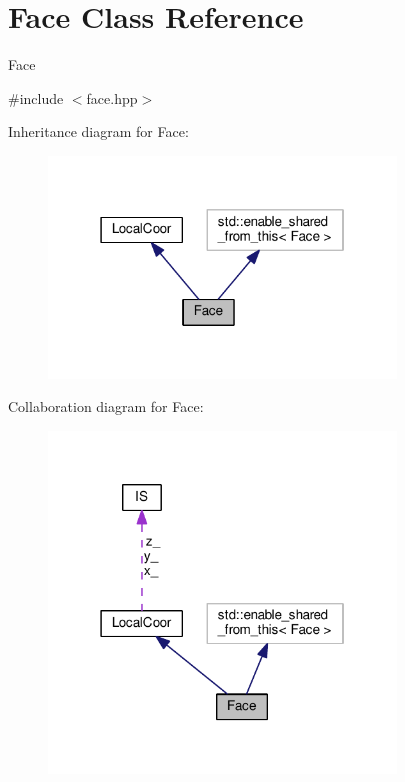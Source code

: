 \hypertarget{classFace}{\section{Face Class Reference}
\label{classFace}
}


Face  




{\ttfamily \#include $<$face.\+hpp$>$}



Inheritance diagram for Face\+:\nopagebreak
\begin{figure}[H]
\begin{center}
\leavevmode
\includegraphics[width=262pt]{classFace__inherit__graph}
\end{center}
\end{figure}


Collaboration diagram for Face\+:\nopagebreak
\begin{figure}[H]
\begin{center}
\leavevmode
\includegraphics[width=262pt]{classFace__coll__graph}
\end{center}
\end{figure}
